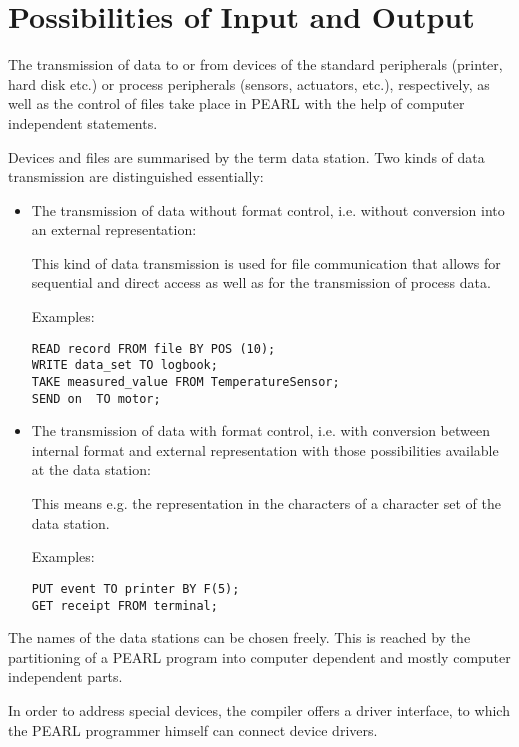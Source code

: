 \section{Possibilities of Input and Output}   %

The transmission of data to or from devices of the standard peripherals (printer, hard disk etc.) 
or process peripherals (sensors, 
actuators, etc.), respectively, as well as the control of files take place in PEARL with 
the help of computer independent statements.

Devices and files are summarised by the term data station. Two kinds of
data transmission are distinguished essentially:

\begin{itemize}
\item The transmission of data without format control, i.e. without
      conversion into an external representation:

      This kind of data transmission is used for file communication that
      allows for sequential and direct access as well as for the transmission
      of process data.

      Examples:
\begin{lstlisting}
READ record FROM file BY POS (10);
WRITE data_set TO logbook;
TAKE measured_value FROM TemperatureSensor;
SEND on  TO motor;
\end{lstlisting}

\item The transmission of data with format control, i.e. with conversion
      between internal format and external representation with those
      possibilities available at the data station:

      This means e.g. the representation in the characters of a character set
      of the data station.

      Examples:

\begin{lstlisting}
PUT event TO printer BY F(5);
GET receipt FROM terminal;
\end{lstlisting}
\end{itemize}

The names of the data stations can be chosen freely. This is reached by the
partitioning of a PEARL program into computer dependent and mostly
computer independent parts.

In order to address special devices, the compiler offers a driver
interface, to which the PEARL programmer himself can connect device
drivers.

